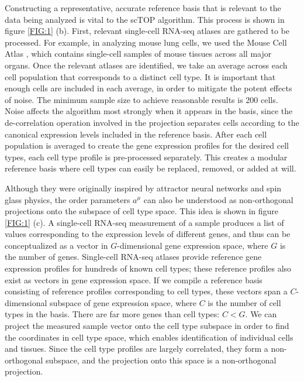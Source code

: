 \documentclass[aps,superscriptaddress, notitlepage,longbibliography]{revtex4-1}
\begin{document}
Constructing a representative, accurate reference basis that is relevant to the data being analyzed is vital to the scTOP algorithm. This process is shown in figure \ref{FIG:1} (b). First, relevant single-cell RNA-seq atlases are gathered to be processed. For example, in analyzing mouse lung cells, we used the Mouse Cell Atlas \cite{noauthor_mapping_nodate}, which contains single-cell samples of mouse tissues across all major organs. Once the relevant atlases are identified, we take an average across each cell population that corresponds to a distinct cell type. It is important that enough cells are included in each average, in order to mitigate the potent effects of noise. The minimum sample size to achieve reasonable results is 200 cells. Noise affects the algorithm most strongly when it appears in the basis, since the de-correlation operation involved in the projection separates cells according to the canonical expression levels included in the reference basis. After each cell population is averaged to create the gene expression profiles for the desired cell types, each cell type profile is pre-processed separately. This creates a modular reference basis where cell types can easily be replaced, removed, or added at will. 

Although they were originally inspired by attractor neural networks and spin glass physics, the order parameters $a^{\mu}$ can also be understood as non-orthogonal projections onto the subspace of cell type space. This idea is shown in figure \ref{FIG:1} (c). A single-cell RNA-seq measurement of a sample produces a list of values corresponding to the expression levels of different genes, and thus can be conceptualized as a vector in $G$-dimensional gene expression space, where $G$ is the number of genes. Single-cell RNA-seq atlases provide reference gene expression profiles for hundreds of known cell types; these reference profiles also exist as vectors in gene expression space. If we compile a reference basis consisting of reference profiles corresponding to cell types, these vectors span a $C$-dimensional subspace of gene expression space, where $C$ is the number of cell types in the basis. There are far more genes than cell types: $C < G$. We can project the measured sample vector onto the cell type subspace in order to find the coordinates in cell type space, which enables identification of individual cells and tissues. Since the cell type profiles are largely correlated, they form a non-orthogonal subspace, and the projection onto this space is a non-orthogonal projection.
\end{document}
